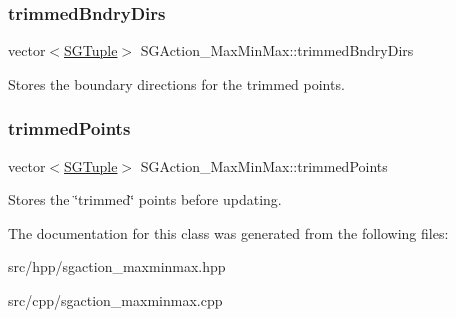 \subsubsection{\texorpdfstring{trimmed\+Bndry\+Dirs}{trimmedBndryDirs}}
{\footnotesize\ttfamily vector$<$\hyperlink{classSGTuple}{S\+G\+Tuple}$>$ S\+G\+Action\+\_\+\+Max\+Min\+Max\+::trimmed\+Bndry\+Dirs\hspace{0.3cm}{\ttfamily [private]}}

Stores the boundary directions for the trimmed points. \mbox{\label{classSGAction__MaxMinMax_aff074b8925e0e4efbe729a1fa760b574}} 
\subsubsection{\texorpdfstring{trimmed\+Points}{trimmedPoints}}
{\footnotesize\ttfamily vector$<$\hyperlink{classSGTuple}{S\+G\+Tuple}$>$ S\+G\+Action\+\_\+\+Max\+Min\+Max\+::trimmed\+Points\hspace{0.3cm}{\ttfamily [private]}}

Stores the \char`\"{}trimmed\char`\"{} points before updating. 

The documentation for this class was generated from the following files\+:\begin{DoxyCompactItemize}
\item 
src/hpp/sgaction\+\_\+maxminmax.\+hpp\item 
src/cpp/sgaction\+\_\+maxminmax.\+cpp\end{DoxyCompactItemize}
